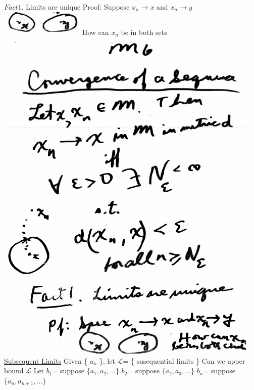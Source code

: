\documentclass[10pt,a4paper]{article}
\begin{document}
{{\newline
$\underline{Fact 1}$. Limits are unique
\newline
Proof: Suppose $x_n \rightarrow x$ and $x_n \rightarrow y$
\newline
\includegraphics[scale=1]{Pages/MS_2_pic2}
\newline
How can $x_n$ be in both sets
\newline
\includegraphics[scale=.5]{Pages/MS_2_im7}
\newpage
\underline{Subsequent Limits}
\newline
Given \{ $a_n$ \}, let $\mathcal{L}$= \{ susequential limits \}
\newline
Can we upper bound $\mathcal{L}$
\newline
Let
$b_1$= suppose $\{ a_1,a_2,... \}$
\newline
$b_2$= suppose $\{ a_2,a_3,... \}$
\newline
$b_n$= suppose $\{ a_n,a_{n+1},... \}$
}}
\end{document}
